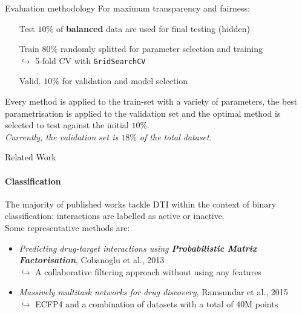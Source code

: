 \documentclass[11pt]{beamer}
\begin{document}
\begin{frame}{Evaluation methodology}
    For maximum transparency and fairness:
    \begin{enumerate}
    \setlength\itemsep{2mm}
        \item[Test] $10\%$ of \textbf{balanced} data are used for final testing (hidden)
        \item[Train] $80\%$ randomly splitted for parameter selection and training \\
        $\hookrightarrow$ 5-fold CV with \texttt{GridSearchCV}
        \item[Valid.] $10\%$ for validation and model selection
    \end{enumerate}
    \vspace{3mm}    
    Every method is applied to the train-set with a variety of parameters, the best parametrisation is applied to the validation set and the optimal method is selected to test against the initial $10\%$.\\
    \vspace{3mm}
    \textit{\footnotesize{Currently, the validation set is $18\%$ of the total dataset.} }
\end{frame}



\begin{frame}{Related Work}
    \framesubtitle{Classification}
    The majority of published works tackle DTI within the context of binary classification: interactions are labelled as active or inactive.\\
    \vspace{5mm}
    Some representative methods are:
    \begin{itemize}
    	\item \textit{Predicting drug-target interactions using \textbf{Probabilistic Matrix Factorisation}}, Cobanoglu et al., 2013\\
    	$\hookrightarrow$ {\footnotesize A collaborative filtering approach without using any features}
    	\item \textit{Massively multitask networks for drug discovery}, Ramsundar et al., 2015\\
    	$\hookrightarrow$ {\footnotesize ECFP4 and a combination of datasets with a total of 40M points}
    \end{itemize}
\end{frame}
\end{document}
